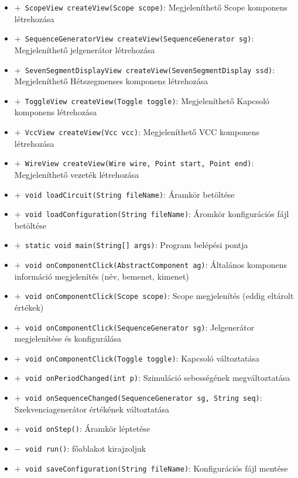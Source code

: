 \begin{itemize}
\begin{itemize}
	\item[] \texttt{$+$ ScopeView createView(Scope scope)}: Megjeleníthető Scope komponens létrehozása
	\item[] \texttt{$+$ SequenceGeneratorView createView(SequenceGenerator sg)}: Megjeleníthető jelgenerátor létrehozása
	\item[] \texttt{$+$ SevenSegmentDisplayView createView(SevenSegmentDisplay ssd)}: Megjeleníthető Hétszegmenses komponens létrehozása
	\item[] \texttt{$+$ ToggleView createView(Toggle toggle)}: Megjeleníthető Kapcsoló komponens létrehozása
	\item[] \texttt{$+$ VccView createView(Vcc vcc)}: Megjeleníthető VCC komponens létrehozása
	\item[] \texttt{$+$ WireView createView(Wire wire, Point start, Point end)}: Megjeleníthető vezeték létrehozása
	\item[] \texttt{$+$ void loadCircuit(String fileName)}: Áramkör betöltése
	\item[] \texttt{$+$ void loadConfiguration(String fileName)}: Áromkör konfigurációs fájl betöltése
	\item[] \texttt{$+$ static void main(String[] args)}: Program belépési pontja
	\item[] \texttt{$+$ void onComponentClick(AbstractComponent ag)}: Általános komponens információ megjelenítés (név, bemenet, kimenet)
	\item[] \texttt{$+$ void onComponentClick(Scope scope)}: Scope megjelenítés (eddig eltárolt értékek)
	\item[] \texttt{$+$ void onComponentClick(SequenceGenerator sg)}: Jelgenerátor megjelenítése és konfigurálása
	\item[] \texttt{$+$ void onComponentClick(Toggle toggle)}: Kapcsoló változtatása
	\item[] \texttt{$+$ void onPeriodChanged(int p)}: Szimuláció sebességének megváltoztatása
	\item[] \texttt{$+$ void onSequenceChanged(SequenceGenerator sg, String seq)}: Szekvenciagenerátor értékének változtatása
	\item[] \texttt{$+$ void onStep()}: Áramkör léptetése
	\item[] \texttt{$-$ void run()}: főablakot kirajzoljuk
	\item[] \texttt{$+$ void saveConfiguration(String fileName)}: Konfigurációs fájl mentése
\end{itemize}
\end{itemize}

